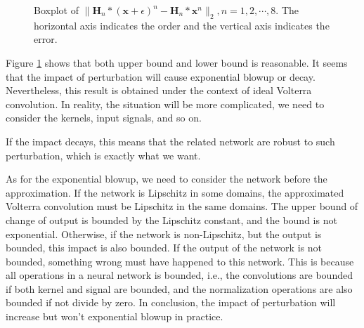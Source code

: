 \documentclass[twoside,11pt]{article}
\def\tvar#1{\mathbf{#1}} %
\begin{document}
\begin{figure}[htb]
  \centering
  \caption{Boxplot of \(\|\tvar{H}_n * (\tvar{x} + \epsilon)^n - \tvar{H}_{n} * \tvar{x}^n\|_2, n = 1,2,\cdots,8\). The horizontal axis indicates the order and the vertical axis indicates the error.}
  \label{fig:statistic-l2norm-diff-conv-h-power-n-add-x-epsilon-conv-h-power-x}
\end{figure}

Figure \ref{fig:statistic-l2norm-diff-conv-h-power-n-add-x-epsilon-conv-h-power-x} shows that both upper bound and lower bound is reasonable. It seems that the impact of perturbation will cause exponential blowup or decay.
Nevertheless, this result is obtained under the context of ideal Volterra convolution.
In reality, the situation will be more complicated, we need to consider the kernels, input signals, and so on.

If the impact decays, this means that the related network are robust to such perturbation, which is exactly what we want.

As for the exponential blowup, we need to consider the network before the approximation.
If the network is Lipschitz in some domains, the approximated Volterra convolution must be Lipschitz in the same domains.
The upper bound of change of output is bounded by the Lipschitz constant, and the bound is not exponential.
Otherwise, if the network is non-Lipschitz, but the output is bounded, this impact is also bounded.
If the output of the network is not bounded, something wrong must have happened to this network. This is because all operations in a neural network is bounded, i.e., the convolutions are bounded if both kernel and signal are bounded, and the normalization operations are also bounded if not divide by zero.
In conclusion, the impact of perturbation will increase but won't exponential blowup in practice.
\end{document}
